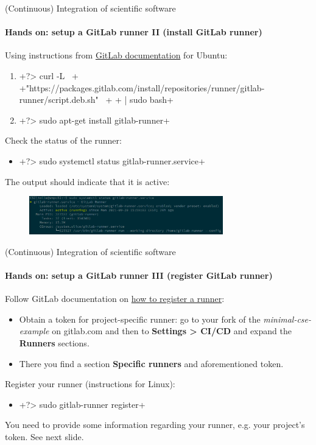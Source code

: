 \begin{frame}{(Continuous) Integration of scientific software}
    \framesubtitle{Hands on: setup a GitLab runner II (install GitLab runner)}
    Using instructions from \href{https://docs.gitlab.com/runner/install/linux-repository.html}{GitLab documentation} for Ubuntu:
    \begin{enumerate}
        \item {}+?> curl -L \ +
              +"https://packages.gitlab.com/install/repositories/runner/gitlab-runner/script.deb.sh" \ +
              +  | sudo bash+
        \item {}+?> sudo apt-get install gitlab-runner+
    \end{enumerate}
    Check the status of the runner:
    \begin{itemize}
        \item {}+?> sudo systemctl status gitlab-runner.service+
    \end{itemize}
    The output should indicate that it is active:
    \begin{figure}
        \includegraphics[width=0.75\textwidth]{figures/gitlab-runner-active.png}
    \end{figure}
\end{frame}


\begin{frame}{(Continuous) Integration of scientific software}
    \framesubtitle{Hands on: setup a GitLab runner III (register GitLab runner)}
    Follow GitLab documentation on \href{https://docs.gitlab.com/runner/register/index.html}{how to register a runner}:
    \begin{itemize}
        \item Obtain a token for project-specific runner: go to your fork of the \emph{minimal-cse-example} on gitlab.com and then to \textbf{Settings > CI/CD} and expand the \textbf{Runners} sections.
        \item There you find a section \textbf{Specific runners} and aforementioned token.
    \end{itemize}
    Register your runner (instructions for Linux):
    \begin{itemize}
        \item {}+?> sudo gitlab-runner register+
    \end{itemize}
    You need to provide some information regarding your runner, e.g. your project's token. See next slide.
\end{frame}


